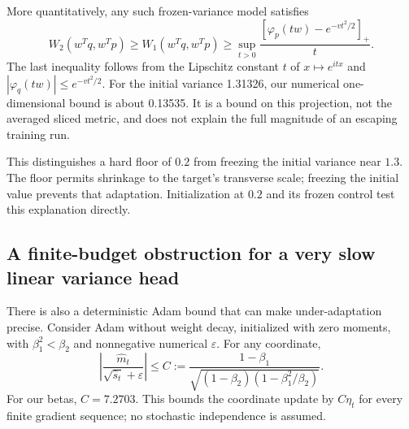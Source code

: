 \documentclass[11pt,a4paper]{article}
\begin{document}
More quantitatively, any such frozen-variance model satisfies
\[
 W_2(w^Tq,w^Tp)\ge W_1(w^Tq,w^Tp)
 \ge\sup_{t>0}\frac{[\varphi_p(tw)-e^{-vt^2/2}]_+}{t}.
\]
The last inequality follows from the Lipschitz constant $t$ of
$x\mapsto e^{itx}$ and $|\varphi_q(tw)|\le e^{-vt^2/2}$.
For the initial variance 1.31326, our numerical one-dimensional bound is
about 0.13535. It is a bound on this projection, not the averaged sliced
metric, and does not explain the full magnitude of an escaping training run.

This distinguishes a hard floor of $0.2$ from freezing the initial variance
near $1.3$. The floor permits shrinkage to the target's transverse scale;
freezing the initial value prevents that adaptation. Initialization at $0.2$
and its frozen control test this explanation directly.

\subsection{A finite-budget obstruction for a very slow linear variance head}
There is also a deterministic Adam bound that can make under-adaptation precise.
Consider Adam without weight decay, initialized with zero moments, with
$\beta_1^2<\beta_2$ and nonnegative numerical $\varepsilon$. For any coordinate,
\begin{equation}
 \left|\frac{\widehat m_t}{\sqrt{\widehat s_t}+\varepsilon}\right|
 \le C:=\frac{1-\beta_1}{\sqrt{(1-\beta_2)(1-\beta_1^2/\beta_2)}}.
 \label{eq:adam-bound}
\end{equation}
For our betas, $C=7.2703$. This bounds the coordinate update by $C\eta_t$
for every finite gradient sequence; no stochastic independence is assumed.
\end{document}

